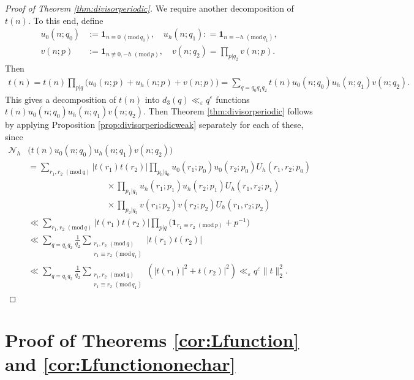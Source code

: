 \documentclass[12pt]{amsart}
\theoremstyle{definition}
\theoremstyle{remark}
\numberwithin{equation}{section}
\newcommand{\1}{{\mathbf 1}}
\newcommand{\eps}{\varepsilon}
\renewcommand{\pmod}[1]{\,\,(\mathrm{mod}\,{#1})}
\begin{document}
\begin{proof}[Proof of Theorem \ref{thm:divisorperiodic}]
    We require another decomposition of $t(n)$. To this end, define
    \begin{align*}
        u_0(n;q_0) &:= \mathbf{1}_{n \equiv 0 \pmod{q_0}}, \quad       u_h(n;q_1): = \mathbf{1}_{n \equiv -h \pmod{q_1}}, \\
        v(n;p) &:=  \mathbf{1}_{n \not \equiv 0,-h \pmod{p}}, \quad v(n;q_2) = \prod_{p|q_2}  v(n;p).
    \end{align*}
    Then
    \begin{align*}
        t(n) = t(n) \prod_{p|q} \bigg(u_0(n;p) + u_h(n;p) + v(n;p) \bigg) = \sum_{q=q_0 q_1 q_2} t(n)  u_0(n;q_0) u_h(n;q_1) v(n;q_2). 
    \end{align*}
    This gives a decomposition of $t(n)$ into $  d_3(q)\ll_\eps q^\eps$ functions $t(n)  u_0(n;q_0) u_h(n;q_1) v(n;q_2).$ Then Theorem \ref{thm:divisorperiodic} follows by applying Proposition \ref{prop:divisorperiodicweak} separately for each of these, since
    \begin{align*}
        \mathcal{N}_h &\bigg(t(n)  u_0(n;q_0) u_h(n;q_1) v(n;q_2)\bigg) \\
       & = \sum_{r_1,r_2 \pmod{q}} |t(r_1) t(r_2)| \prod_{p_0|q_0} u_0(r_1;p_0) u_0(r_2;p_0) U_h(r_1,r_2;p_0)  \\
    &   \hspace{110pt} \times \prod_{p_1|q_1}  u_h(r_1;p_1) u_h(r_2;p_1) U_h(r_1,r_2;p_1) \\
     & \hspace{110pt}  \times \prod_{p_2|q_2} v(r_1;p_2) v(r_2;p_2) U_h(r_1,r_2;p_2) \\
      & \ll  \sum_{r_1,r_2 \pmod{q}} |t(r_1) t(r_2)| \prod_{p|q} \bigg( \mathbf{1}_{r_1 \equiv  r_2 \pmod{p}} + p^{-1} \bigg) \\
      & \ll \sum_{q=q_1 q_2} \frac{1}{q_2}  \sum_{\substack{r_1,r_2 \pmod{q}  \\ r_1 \equiv r_2 \pmod{q_1}}} |t(r_1) t(r_2)| \\
      & \ll \sum_{q=q_1 q_2} \frac{1}{q_2}  \sum_{\substack{r_1,r_2 \pmod{q}  \\ r_1 \equiv r_2 \pmod{q_1}}} (|t(r_1)|^2 + t(r_2)|^2) \ll_\eps q^\eps \|t\|_2^2.
    \end{align*}
\end{proof}








\section{Proof of Theorems  \ref{cor:Lfunction} and \ref{cor:Lfunctiononechar}} \label{sec:proofapplLfunc}
\end{document}
